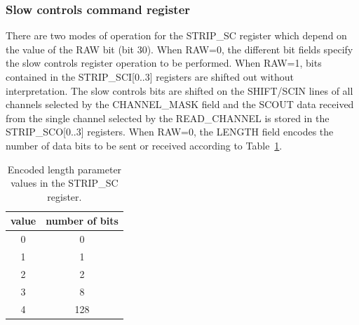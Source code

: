 \documentclass[11pt]{article}
\begin{document}
\clearpage
\subsubsection{Slow controls command register}
There are two modes of operation for the STRIP\_SC register which depend on
the value of the RAW bit (bit 30).  When RAW=0, the different bit fields
specify the slow controls register operation to be performed.  When
RAW=1, bits contained in the STRIP\_SCI[0..3] registers are shifted out
without interpretation.  The slow controls bits are shifted on the
SHIFT/SCIN lines of all channels selected by the CHANNEL\_MASK field and
the SCOUT data received from the single channel selected by the READ\_CHANNEL
is stored in the STRIP\_SCO[0..3] registers.  When RAW=0, the LENGTH field
encodes the number of data bits to be sent or received according to
Table~\ref{tab-sclen}.
\begin{table}
\begin{center}
\small
\begin{tabular}{|c|c|} \hline 
value & number of bits \\ \hline
0 & 0 \\
1 & 1 \\
2 & 2 \\
3 & 8 \\
4 & 128 \\ \hline
\end{tabular}
\end{center}
\caption{\label{tab-sclen}Encoded length parameter values in
the STRIP\_SC register.}
\end{table}
\end{document}
